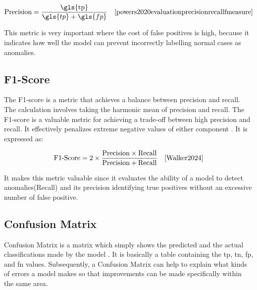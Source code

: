 \begin{equation}
    \text{Precision} = \frac{\text{\gls{tp}}}{\gls{tp} + \gls{fp}} \quad \text{\cite{powers2020evaluationprecisionrecallfmeasure}}
    \label{eq:precision}
\end{equation}

This metric is very important where the cost of false positives is high, because it indicates how well the model can prevent incorrectly labelling normal cases as anomalies. 

\subsection*{F1-Score}
\label{subsec:F1-Score}

The F1-score is a metric that achieves a balance between precision and recall. The calculation involves taking the harmonic mean of precision and recall. The F1-score is a valuable metric for achieving a trade-off between high precision and recall. It effectively penalizes extreme negative values of either component \cite{Walker2024}. It is expressed as:

\begin{equation}
\text{F1-Score} = 2 \times \frac{\text{Precision} \times \text{Recall}}{\text{Precision} + \text{Recall}} \quad \text{\cite{Walker2024}}
\end{equation}

It makes this metric valuable since it evaluates the ability of a model to detect anomalies(Recall) and  its precision identifying true positives without an excessive number of false positive. 

\subsection*{Confusion Matrix}
\label{subsec:Confusion Matrix}

Confusion Matrix is a matrix which simply shows the predicted and the actual classifications made by the model \cite{Kohavi1998}. It is basically a table containing the \gls{tp}, \gls{tn}, \gls{fp}, and \gls{fn} values. Subsequently, a Confusion Matrix can help to explain what kinds of errors a model makes so that improvements can be made specifically within the same area.

